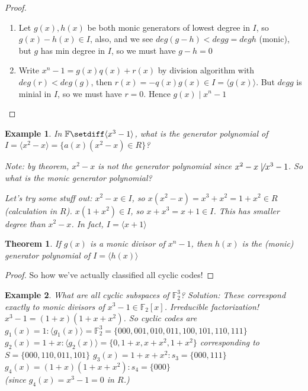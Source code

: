 \documentclass{article}
\newtheorem{thm}{Theorem}
\newtheorem{eg}{Example}
\begin{document}
\begin{proof}
    \begin{enumerate}
        \item Let $g(x), h(x)$ be both monic generators of lowest degree in $I$, so
            $g(x) -h(x)\in I$, also, and we see $deg(g-h) < deg g = degh$
            (monic), but $g$ has min degree in $I$, so we must have $g-h=0$
        \item Write $x^n - 1 = g(x)q(x) + r(x)$ by division algorithm with
            $deg(r) < deg(g)$, then $r(x) = -q(x)g(x)\in I = \langle g(x) \rangle$.
            But $deg g$ is minial in $I$, so we must have $r=0$. Hence $g(x) \mid x^n-1$
    \end{enumerate}
\end{proof}

\begin{eg}
    In $\mathbb{F}\setdiff \langle x^3-1 \rangle$, what is the generator polynomial
    of $I = \langle x^2 - x\rangle = \{a(x)(x^2 - x)\in R\}$?

    Note: by theorem, $x^2-x$ is not the generator polynomial since $x^2 - x\not\mid
    x^3 - 1$. So what is the monic generator polynomial?

    Let's try some stuff out:
    $x^2-x\in I$, so $x(x^2-x) = x^3 + x^2 = 1+x^2\in R$ (calculation in $R$).
    $x(1+x^2)\in I$, so $x+x^3 = x+1\in I$. This has smaller degree than
    $x^2-x$. In fact, $I = \langle x + 1\rangle$
\end{eg}

\begin{thm}
    If $g(x)$ is a monic divisor of $x^n-1$, then $h(x)$ is the (monic) generator
    polynomial of $I = \langle h(x) \rangle$
\end{thm}

\begin{proof}
    So how we've actually classified all cyclic codes!
\end{proof}

\begin{eg}
    What are all cyclic subspaces of $\mathbb{F}_2^3$? Solution:
    These correspond exactly to monic divisors of $x^3 -1\in\mathbb{F}_2[x]$.
    Irreducible factorization! $x^3-1 = (1+x)(1+x+x^2)$. So cyclic codes are
    $g_1(x) = 1: \langle g_1(x) \rangle = \mathbb{F}_2^3 =
    \{000, 001, 010, 011, 100, 101, 110, 111\}$\\
    $g_2(x) = 1+x: \langle g_2(x)\rangle = \{0, 1+x, x+x^2, 1+x^2\}$
    corresponding to $S = \{000, 110, 011, 101\}$
    $g_3(x) = 1+x+x^2: s_3 = \{000, 111\}$\\
    $g_4(x) = (1+x)(1+x+x^2): s_4 = \{000\}$\\
    (since $g_4(x) = x^3 - 1 = 0$ in $R$.)
\end{eg}
\end{document}
